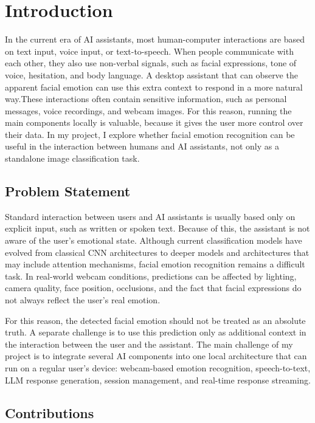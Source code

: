 \chapter{Introduction}

In the current era of AI assistants, most human-computer interactions are based on text input, voice input, or text-to-speech. When people communicate with each other, they also use non-verbal signals, such as facial expressions, tone of voice, hesitation, and body language. A desktop assistant that can observe the apparent facial emotion can use this extra context to respond in a more natural way.These interactions often contain sensitive information, such as personal messages, voice recordings, and webcam images. For this reason, running the main components locally is valuable, because it gives the user more control over their data. In my project, I explore whether facial emotion recognition can be useful in the interaction between humans and AI assistants, not only as a standalone image classification task.

\section{Problem Statement}

Standard interaction between users and AI assistants is usually based only on explicit input, such as written or spoken text. Because of this, the assistant is not aware of the user's emotional state. Although current classification models have evolved from classical CNN architectures to deeper models and architectures that may include attention mechanisms, facial emotion recognition remains a difficult task. In real-world webcam conditions, predictions can be affected by lighting, camera quality, face position, occlusions, and the fact that facial expressions do not always reflect the user's real emotion.

For this reason, the detected facial emotion should not be treated as an absolute truth. A separate challenge is to use this prediction only as additional context in the interaction between the user and the assistant. The main challenge of my project is to integrate several AI components into one local architecture that can run on a regular user's device: webcam-based emotion recognition, speech-to-text, LLM response generation, session management, and real-time response streaming.

\section{Contributions}

